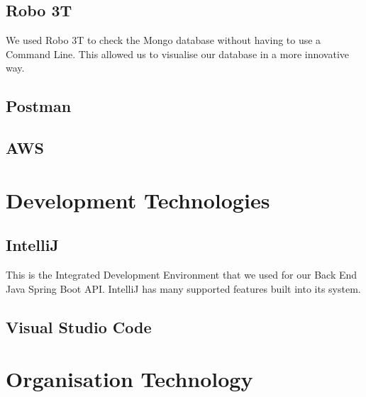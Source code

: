 \subsection{Robo 3T}
We used Robo 3T to check the Mongo database without having to use a Command Line. This allowed us to visualise our database in a more innovative way.
\subsection{Postman}
\subsection{AWS}

\section{Development Technologies}

\subsection{IntelliJ}
This is the Integrated Development Environment that we used for our Back End Java Spring Boot API. IntelliJ has many supported features built into its system.
\subsection{Visual Studio Code}

\section{Organisation Technology}

